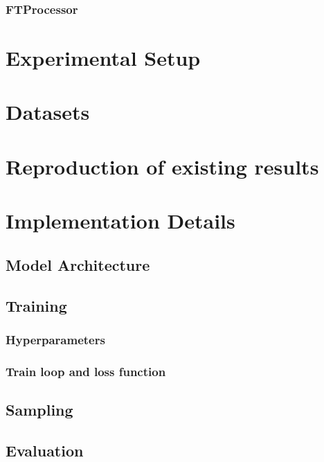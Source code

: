 \subsubsection*{FTProcessor}
\label{ch:FTProcessor}



\section{Experimental Setup}
\label{ch:methods-experimentalSetup}
\section{Datasets}
\label{ch:methods-datasets}
\section{Reproduction of existing results}

\section{Implementation Details}
\label{ch:methods-implementationDetails}

\subsection{Model Architecture}
\label{ch:methods-implementationDetails-modelArchitecture}

\subsection{Training}
\label{ch:methods-implementationDetails-training}

\subsubsection{Hyperparameters}
\label{ch:methods-implementationDetails-training-hyperparameters}

\subsubsection{Train loop and loss function}
\label{ch:methods-implementationDetails-training-trainLoopAndLossFunction}

\subsection{Sampling}
\label{ch:methods-implementationDetails-sampling}

\subsection{Evaluation}
\label{ch:methods-implementationDetails-evaluation}
